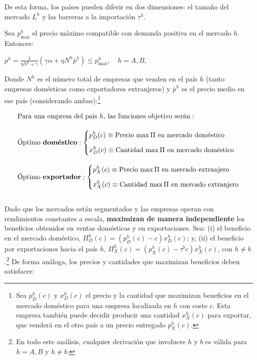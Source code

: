 \documentclass[10pt,a4paper]{article}
\begin{document}
De esta forma, los países pueden diferir en dos dimensiones: el tamaño del mercado $L^h$ y las barreras a la importación $\tau^h$.

Sea $p_{\max}^h$ el precio máximo compatible con demanda positiva en el mercado $h$. Entonces:

$p^h = \frac{1}{\eta N^h + \gamma} (\gamma \alpha + \eta N^h \bar{p}^h)\leq p_{\max}^h, \quad h = A, B$,

Donde $N^h$ es el número total de empresas que venden en el país $h$ (tanto empresas domésticas como exportadores extranjeros) y $\bar{p}^h$ es el precio medio en ese país (considerando ambas):\footnote{%
    Sea $p_D^h(c)$ y $x_D^h(c)$ el precio y la cantidad que maximizan beneficios en el mercado doméstico para una empresa localizada en $h$ con coste $c$. Esta empresa también puede decidir producir una cantidad $x_X^h(c)$ para exportar, que venderá en el otro país a un precio entregado $p_X^h(c)$.
}

$$\begin{aligned}
    &\text{Para una empresa del país $h$, las funciones objetivo serán}:\\[1em]
    &\text{Óptimo \textbf{doméstico}}:\left\{\begin{aligned}
        &p_D^h(c)\equiv \text{Precio $\max \Pi$ en mercado doméstico}\\[0.5em]
        &x_D^h(c)\equiv \text{Cantidad $\max \Pi$ en mercado doméstico}
    \end{aligned}\right.\\[1em]
    &\text{Óptimo \textbf{exportador}}:\left\{\begin{aligned}
        &p_X^h(c)\equiv \text{Precio $\max \Pi$ en mercado extranjero}\\[0.5em]
        &x_X^h(c)\equiv \text{Cantidad $\max \Pi$ en mercado extranjero}
    \end{aligned}\right.\\[1em]
\end{aligned}$$

Dado que los mercados están segmentados y las empresas operan con rendimientos constantes a escala, \textbf{maximizan de manera independiente} los beneficios obtenidos en ventas domésticas y en exportaciones. Sea: (i) el beneficio en el mercado doméstico, $\Pi_D^h(c) = (p_D^h(c)-c) x_D^h(c)$; y, (ii) el beneficio por exportaciones hacia el país $h$, $\Pi_X^h(c) = (p_X^h(c) - \tau^b c) x_X^h(c)$, con $h \neq b$.\footnote{%
    En todo este análisis, cualquier derivación que involucre $h$ y $b$ es válida para $h = A, B$ y $h \neq b$.
} De forma análoga, los precios y cantidades que maximizan beneficios deben satisfacer:
\end{document}
